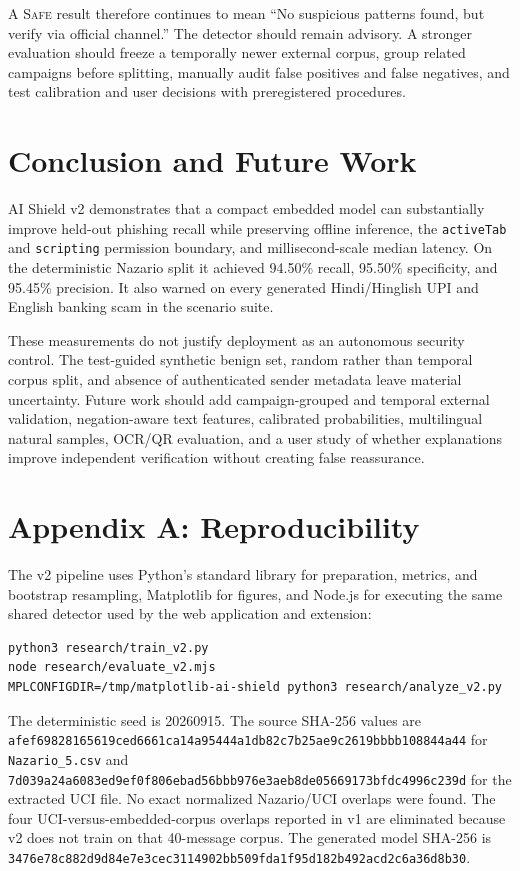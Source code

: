 A \textsc{Safe} result therefore continues to mean ``No suspicious patterns found,
but verify via official channel.''  The detector should remain advisory.  A stronger
evaluation should freeze a temporally newer external corpus, group related campaigns
before splitting, manually audit false positives and false negatives, and test
calibration and user decisions with preregistered procedures.

\section{Conclusion and Future Work}

AI Shield v2 demonstrates that a compact embedded model can substantially improve
held-out phishing recall while preserving offline inference, the \texttt{activeTab}
and \texttt{scripting} permission boundary, and millisecond-scale median latency.
On the deterministic Nazario split it achieved 94.50\% recall, 95.50\% specificity,
and 95.45\% precision.  It also warned on every generated Hindi/Hinglish UPI and
English banking scam in the scenario suite.

These measurements do not justify deployment as an autonomous security control.
The test-guided synthetic benign set, random rather than temporal corpus split, and
absence of authenticated sender metadata leave material uncertainty.  Future work
should add campaign-grouped and temporal external validation, negation-aware text
features, calibrated probabilities, multilingual natural samples, OCR/QR evaluation,
and a user study of whether explanations improve independent verification without
creating false reassurance.

\section*{Appendix A: Reproducibility}

The v2 pipeline uses Python's standard library for preparation, metrics, and
bootstrap resampling, Matplotlib for figures, and Node.js for executing the same
shared detector used by the web application and extension:
\begin{verbatim}
python3 research/train_v2.py
node research/evaluate_v2.mjs
MPLCONFIGDIR=/tmp/matplotlib-ai-shield python3 research/analyze_v2.py
\end{verbatim}
The deterministic seed is 20260915.  The source SHA-256 values are
\texttt{afef69828165619ced6661ca14a95444a1db82c7b25ae9c2619bbbb108844a44}
for \texttt{Nazario\_5.csv} and
\texttt{7d039a24a6083ed9ef0f806ebad56bbb976e3aeb8de05669173bfdc4996c239d}
for the extracted UCI file.  No exact normalized Nazario/UCI overlaps were found.
The four UCI-versus-embedded-corpus overlaps reported in v1 are eliminated because
v2 does not train on that 40-message corpus.  The generated model SHA-256 is
\texttt{3476e78c882d9d84e7e3cec3114902bb509fda1f95d182b492acd2c6a36d8b30}.
